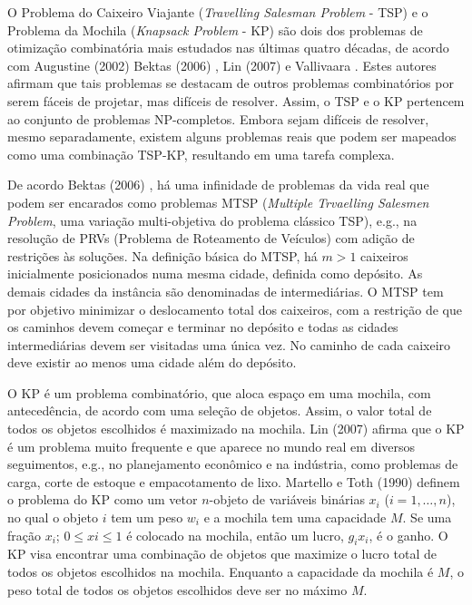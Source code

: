 O Problema do Caixeiro Viajante (\textit{Travelling Salesman Problem} - TSP) e o Problema da Mochila (\textit{Knapsack Problem} - KP) são dois dos problemas de otimização combinatória mais estudados nas últimas quatro décadas, de acordo com Augustine (2002) \cite{augustine2002offline} Bektas (2006) \cite{bektas2006multiple}, Lin (2007) \cite{lin2008solving} e Vallivaara \cite{vallivaara2008team}. Estes autores afirmam que tais problemas se destacam de outros problemas combinatórios por serem fáceis de projetar, mas difíceis de resolver. Assim, o TSP e o KP pertencem ao conjunto de problemas NP-completos. Embora sejam difíceis de resolver, mesmo separadamente, existem alguns problemas reais que podem ser mapeados como uma combinação TSP-KP, resultando em uma tarefa complexa.

De acordo Bektas (2006) \cite{bektas2006multiple}, há uma infinidade de problemas da vida real que podem ser encarados como problemas MTSP (\textit{Multiple Trvaelling Salesmen Problem}, uma variação multi-objetiva do problema clássico TSP), e.g., na resolução de PRVs (Problema de Roteamento de Veículos) com adição de restrições às soluções. Na definição básica do MTSP, há $m > 1$ caixeiros inicialmente posicionados numa mesma cidade, definida como depósito. As demais cidades da instância são denominadas de intermediárias. O MTSP tem por objetivo minimizar o deslocamento total dos caixeiros, com a restrição de que os caminhos devem começar e terminar no depósito e todas as cidades intermediárias devem ser visitadas uma única vez. No caminho de cada caixeiro deve existir ao menos uma cidade além do depósito.

O KP é um problema combinatório, que aloca espaço em uma mochila, com antecedência, de acordo com uma seleção de objetos. Assim, o valor total de todos os objetos escolhidos é maximizado na mochila. Lin (2007) \cite{lin2008solving} afirma que o KP é um problema muito frequente e que aparece no mundo real em diversos seguimentos, e.g., no planejamento econômico e na indústria, como problemas de carga, corte de estoque e empacotamento de lixo. Martello e Toth (1990) \cite{Martello:1990:KPA:98124} definem o problema do KP como um vetor $n$-objeto de variáveis binárias $x_i$ ($i = 1,…, n$), no qual o objeto $i$ tem um peso $w_i$ e a mochila tem uma capacidade $M$. Se uma fração $x_i$; $0 \leq xi \leq 1$ é colocado na mochila, então um lucro, $g_i x_i$, é o ganho. O KP visa encontrar uma combinação de objetos que maximize o lucro total de todos os objetos escolhidos na mochila. Enquanto a capacidade da mochila é $M$, o peso total de todos os objetos escolhidos deve ser no máximo $M$.

